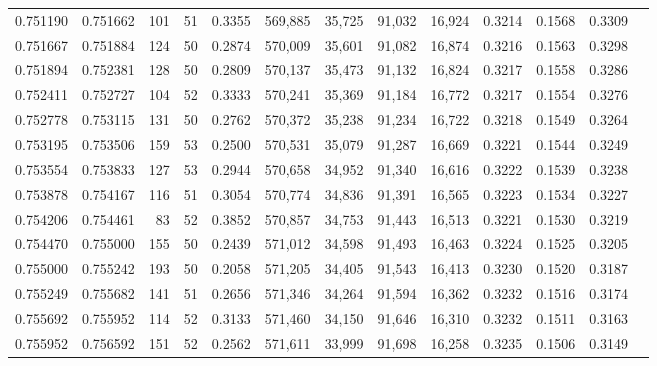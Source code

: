 \begin{tabular}{rrrrrrrrrrrrr}
0.751190 & 0.751662 &    101 &    51 &                                     0.3355 & 569,885 &  35,725 &  91,032 &  16,924 & 0.3214 & 0.1568 & 0.3309 \\
0.751667 & 0.751884 &    124 &    50 &                                     0.2874 & 570,009 &  35,601 &  91,082 &  16,874 & 0.3216 & 0.1563 & 0.3298 \\
0.751894 & 0.752381 &    128 &    50 &                                     0.2809 & 570,137 &  35,473 &  91,132 &  16,824 & 0.3217 & 0.1558 & 0.3286 \\
0.752411 & 0.752727 &    104 &    52 &                                     0.3333 & 570,241 &  35,369 &  91,184 &  16,772 & 0.3217 & 0.1554 & 0.3276 \\
0.752778 & 0.753115 &    131 &    50 &                                     0.2762 & 570,372 &  35,238 &  91,234 &  16,722 & 0.3218 & 0.1549 & 0.3264 \\
0.753195 & 0.753506 &    159 &    53 &                                     0.2500 & 570,531 &  35,079 &  91,287 &  16,669 & 0.3221 & 0.1544 & 0.3249 \\
0.753554 & 0.753833 &    127 &    53 &                                     0.2944 & 570,658 &  34,952 &  91,340 &  16,616 & 0.3222 & 0.1539 & 0.3238 \\
0.753878 & 0.754167 &    116 &    51 &                                     0.3054 & 570,774 &  34,836 &  91,391 &  16,565 & 0.3223 & 0.1534 & 0.3227 \\
0.754206 & 0.754461 &     83 &    52 &                                     0.3852 & 570,857 &  34,753 &  91,443 &  16,513 & 0.3221 & 0.1530 & 0.3219 \\
0.754470 & 0.755000 &    155 &    50 &                                     0.2439 & 571,012 &  34,598 &  91,493 &  16,463 & 0.3224 & 0.1525 & 0.3205 \\
0.755000 & 0.755242 &    193 &    50 &                                     0.2058 & 571,205 &  34,405 &  91,543 &  16,413 & 0.3230 & 0.1520 & 0.3187 \\
0.755249 & 0.755682 &    141 &    51 &                                     0.2656 & 571,346 &  34,264 &  91,594 &  16,362 & 0.3232 & 0.1516 & 0.3174 \\
0.755692 & 0.755952 &    114 &    52 &                                     0.3133 & 571,460 &  34,150 &  91,646 &  16,310 & 0.3232 & 0.1511 & 0.3163 \\
0.755952 & 0.756592 &    151 &    52 &                                     0.2562 & 571,611 &  33,999 &  91,698 &  16,258 & 0.3235 & 0.1506 & 0.3149 \\

\end{tabular}
